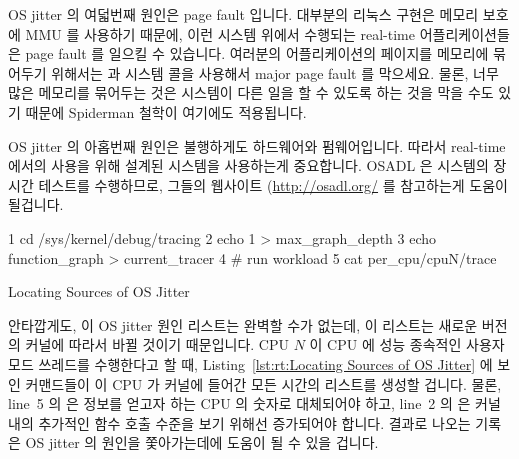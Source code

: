 OS jitter 의 여덟번째 원인은 page fault 입니다.
대부분의 리눅스 구현은 메모리 보호에 MMU 를 사용하기 때문에, 이런 시스템 위에서
수행되는 real-time 어플리케이션들은 page fault 를 일으킬 수 있습니다.
여러분의 어플리케이션의 페이지를 메모리에 묶어두기 위해서는  과
 시스템 콜을 사용해서 major page fault 를 막으세요.
물론, 너무 많은 메모리를 묶어두는 것은 시스템이 다른 일을 할 수 있도록 하는
것을 막을 수도 있기 때문에 Spiderman 철학이 여기에도 적용됩니다.

OS jitter 의 아홉번째 원인은 불행하게도 하드웨어와 펌웨어입니다.
따라서 real-time 에서의 사용을 위해 설계된 시스템을 사용하는게 중요합니다.
OSADL 은 시스템의 장시간 테스트를 수행하므로, 그들의 웹사이트
(\url{http://osadl.org/} 를 참고하는게 도움이 될겁니다.

\begin{listing}[tb]
{ \scriptsize
\begin{verbbox}
 1 cd /sys/kernel/debug/tracing
 2 echo 1 > max_graph_depth
 3 echo function_graph > current_tracer
 4 # run workload
 5 cat per_cpu/cpuN/trace
\end{verbbox}
}
\centering
\theverbbox
\caption{Locating Sources of OS Jitter}
\label{lst:advsync:Locating Sources of OS Jitter}
\end{listing}

안타깝게도, 이 OS jitter 원인 리스트는 완벽할 수가 없는데, 이 리스트는 새로운
버전의 커널에 따라서 바뀔 것이기 때문입니다.
CPU $N$ 이 CPU 에 성능 종속적인 사용자 모드 쓰레드를 수행한다고 할 때,
Listing~\ref{lst:rt:Locating Sources of OS Jitter}
에 보인 커맨드들이 이 CPU 가 커널에 들어간 모든 시간의 리스트를 생성할 겁니다.
물론, line~5 의  은 정보를 얻고자 하는 CPU 의 숫자로 대체되어야 하고,
line~2 의  은 커널 내의 추가적인 함수 호출 수준을 보기 위해선 증가되어야
합니다.
결과로 나오는 기록은 OS jitter 의 원인을 쫓아가는데에 도움이 될 수 있을 겁니다.

